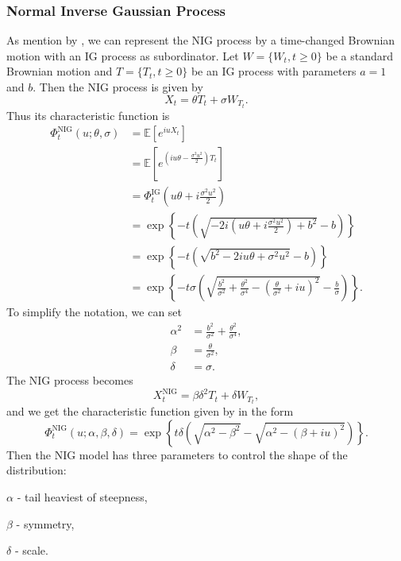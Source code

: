 \subsubsection*{Normal Inverse Gaussian Process}
As mention by \citeauthor{Gem02} \citeyearpar{Gem02}, we can represent the NIG process by a time-changed Brownian motion with an IG process as subordinator. Let $W=\{W_t,t\geq0\}$ be a standard Brownian motion and $T=\{T_t,t\geq0\}$ be an IG process with parameters $a=1$ and $b$. Then the NIG process is given by
$$X_t = \theta T_t + \sigma W_{T_t}.$$
Thus its characteristic function is
\begin{align*}
\Phi_t^\text{NIG}(u;\theta,\sigma) &= \mathbb{E}\left[e^{iuX_t}\right]\\
&=\mathbb{E}\left[e^{\left(iu\theta -\frac{\sigma^2 u^2}{2}\right)T_t}\right]\\
&=\Phi^\text{IG}_t\left(u\theta +i\frac{\sigma^2 u^2}{2}\right)\\
&= \exp\left\{-t\left(\sqrt{-2i\left(u\theta +i\frac{\sigma^2 u^2}{2}\right)+b^2}-b\right)\right\}\\
&=\exp\left\{-t\left(\sqrt{b^2-2iu\theta+\sigma^2u^2}-b\right)\right\}\\
&=\exp\left\{-t\sigma\left(\sqrt{\frac{b^2}{\sigma^2}+\frac{\theta^2}{\sigma^4}-\left(\frac{\theta}{\sigma^2}+iu\right)^2}-\frac{b}{\sigma}\right)\right\}.
\end{align*}
To simplify the notation, we can set
\begin{align*}
\alpha^2 &= \frac{b^2}{\sigma^2}+\frac{\theta^2}{\sigma^4},\\ 
\beta &= \frac{\theta}{\sigma^2},\\
\delta &= \sigma.
\end{align*}
The NIG process becomes
$$X_t^\text{NIG} = \beta\delta^2 T_t + \delta W_{T_t},$$
and we get the characteristic function given by \citeauthor{Bar97a} \citeyearpar{Bar97a} in the form
$$\Phi_t^\text{NIG}(u;\alpha,\beta,\delta) = \exp\left\{t\delta\left(\sqrt{\alpha^2-\beta^2}-\sqrt{\alpha^2-(\beta+iu)^2}\right)\right\}.$$
Then the NIG model has three parameters to control the shape of the distribution:
\begin{my_list_item}
\item $\alpha$ - tail heaviest of steepness,
\item $\beta$ - symmetry,
\item $\delta$ - scale.
\end{my_list_item}

